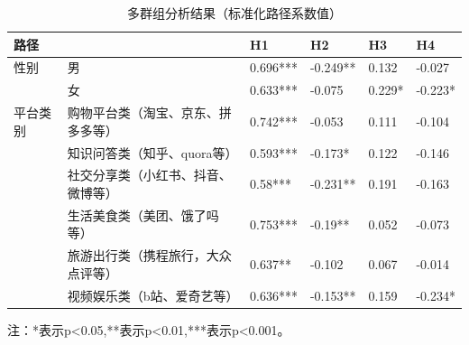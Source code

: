 \begin{table}[H]
\centering
\caption{多群组分析结果（标准化路径系数值）}
\label{tab:multi}
\begin{threeparttable}
\begin{tabular}{@{}llllll@{}}
\toprule
\textbf{路径} & \textbf{}         & \textbf{H1} & \textbf{H2} & \textbf{H3} & \textbf{H4} \\ \midrule
性别          & 男                 & 0.696***    & -0.249**    & 0.132       & -0.027      \\
            & 女                 & 0.633***    & -0.075      & 0.229*      & -0.223*     \\ \midrule
平台类别        & 购物平台类（淘宝、京东、拼多多等） & 0.742***    & -0.053      & 0.111       & -0.104      \\
            & 知识问答类（知乎、quora等）  & 0.593***    & -0.173*     & 0.122       & -0.146      \\
            & 社交分享类（小红书、抖音、微博等） & 0.58***     & -0.231**    & 0.191       & -0.163      \\
            & 生活美食类（美团、饿了吗等）    & 0.753***    & -0.19**     & 0.052       & -0.073      \\
            & 旅游出行类（携程旅行，大众点评等） & 0.637**     & -0.102      & 0.067       & -0.014      \\
            & 视频娱乐类（b站、爱奇艺等）    & 0.636***    & -0.153**    & 0.159       & -0.234*     \\ \bottomrule
\end{tabular}
\begin{tablenotes}
    \item 注：*表示p<0.05,**表示p<0.01,***表示p<0.001。
\end{tablenotes}
\end{threeparttable}
\end{table}
